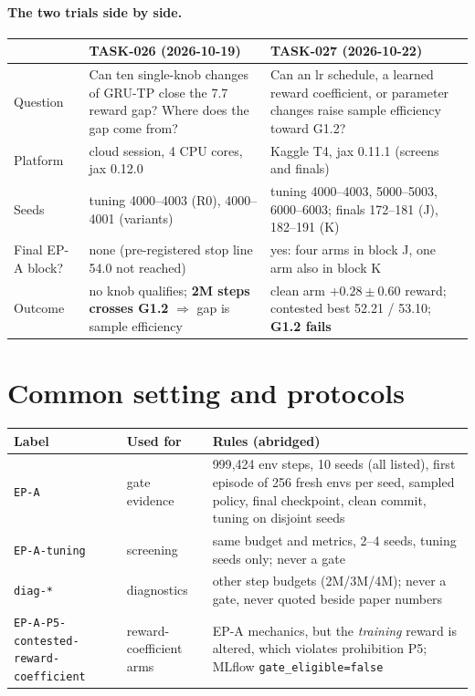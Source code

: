 \documentclass[10pt,a4paper]{article}
\newcommand{\p}[1]{\texttt{\small #1}}
\begin{document}
\paragraph{The two trials side by side.}
\begin{center}\small
\begin{tabular}{@{}p{2.6cm}p{6.7cm}p{6.7cm}@{}}\toprule
 & \textbf{TASK-026} (2026-10-19) & \textbf{TASK-027} (2026-10-22)\\\midrule
Question & Can ten single-knob changes of GRU-TP close the 7.7 reward gap? Where does the gap come from? & Can an lr schedule, a learned reward coefficient, or parameter changes raise sample efficiency toward G1.2?\\
Platform & cloud session, 4 CPU cores, jax 0.12.0 & Kaggle T4, jax 0.11.1 (screens and finals)\\
Seeds & tuning 4000--4003 (R0), 4000--4001 (variants) & tuning 4000--4003, 5000--5003, 6000--6003; finals 172--181 (J), 182--191 (K)\\
Final EP-A block? & none (pre-registered stop line 54.0 not reached) & yes: four arms in block J, one arm also in block K\\
Outcome & no knob qualifies; \textbf{2M steps crosses G1.2} $\Rightarrow$ gap is sample efficiency & clean arm $+0.28\pm0.60$ reward; contested best 52.21 / 53.10; \textbf{G1.2 fails}\\\bottomrule
\end{tabular}
\end{center}

\section{Common setting and protocols}

\begin{center}\small
\begin{tabular}{@{}p{4.6cm}p{3.0cm}p{8.3cm}@{}}\toprule
\textbf{Label} & \textbf{Used for} & \textbf{Rules (abridged)}\\\midrule
\p{EP-A} & gate evidence & 999{,}424 env steps, 10 seeds (all listed), first episode of 256 fresh envs per seed, sampled policy, final checkpoint, clean commit, tuning on disjoint seeds\\
\p{EP-A-tuning} & screening & same budget and metrics, 2--4 seeds, tuning seeds only; never a gate\\
\p{diag-*} & diagnostics & other step budgets (2M/3M/4M); never a gate, never quoted beside paper numbers\\
\p{EP-A-P5-contested-\allowbreak reward-coefficient} & reward-coefficient arms & EP-A mechanics, but the \emph{training} reward is altered, which violates prohibition P5; MLflow \p{gate\_eligible=false}\\\bottomrule
\end{tabular}
\end{center}
\end{document}
